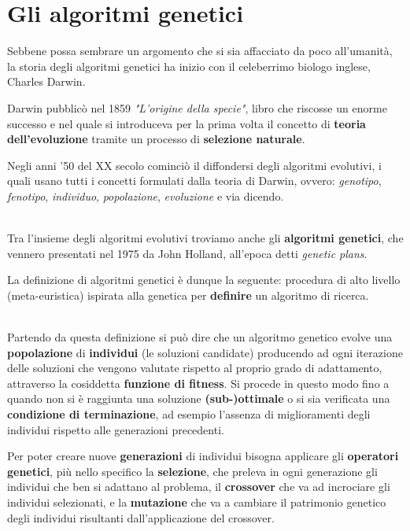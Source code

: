 \documentclass[a4paper, 11pt, oneside]{report}
\begin{document}
            \section{Gli algoritmi genetici}
            Sebbene possa sembrare un argomento che si sia affacciato da poco all'umanità, la storia degli algoritmi genetici
            ha inizio con il celeberrimo biologo inglese, Charles Darwin.
            \par \noindent Darwin pubblicò nel 1859 \textit{"L'origine della specie"}, libro che riscosse un enorme
            successo e nel quale si introduceva per la prima volta il concetto di \textbf{teoria dell'evoluzione} tramite
            un processo di \textbf{selezione naturale}.
            \par \noindent Negli anni '50 del XX secolo cominciò il diffondersi degli algoritmi evolutivi,
            i quali usano tutti i concetti formulati dalla teoria di Darwin, ovvero:
            \textit{genotipo}, \textit{fenotipo}, \textit{individuo}, \textit{popolazione}, \textit{evoluzione} e via dicendo.
            \par \noindent
            \\ \noindent Tra l'insieme degli algoritmi evolutivi troviamo anche gli \textbf{algoritmi genetici}, che vennero
            presentati nel 1975 da John Holland, all'epoca detti \textit{genetic plans}.
            \par \noindent La definizione di algoritmi genetici è dunque la seguente:
            procedura di alto livello (meta-euristica) ispirata alla genetica per \textbf{definire}
            un algoritmo di ricerca.
            \par \noindent
            \\ \noindent Partendo da questa definizione si può dire che un algoritmo genetico evolve una \textbf{popolazione}
            di \textbf{individui} (le soluzioni candidate) producendo ad ogni iterazione delle
            soluzioni che vengono valutate rispetto al proprio grado di adattamento, attraverso la cosiddetta
            \textbf{funzione di fitness}. Si procede in questo modo fino a quando non si è raggiunta
            una soluzione \textbf{(sub-)ottimale} o si sia verificata una \textbf{condizione di terminazione}, ad esempio
            l'assenza di miglioramenti degli individui rispetto alle generazioni precedenti.
            \par \noindent Per poter creare nuove \textbf{generazioni} di individui bisogna applicare gli \textbf{operatori genetici},
            più nello specifico la \textbf{selezione}, che preleva in ogni generazione gli individui che ben si
            adattano al problema, il \textbf{crossover} che va ad incrociare gli individui selezionati, e la \textbf{mutazione} che
            va a cambiare il patrimonio genetico degli individui risultanti dall'applicazione del crossover.
\end{document}
